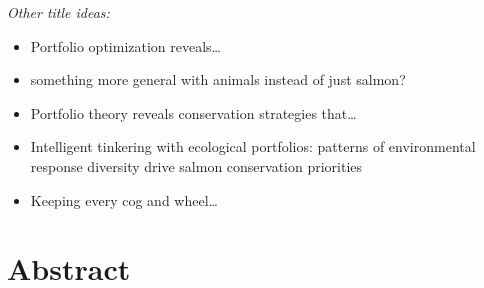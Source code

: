 \emph{Other title ideas:}

\begin{itemize}
\item
  Portfolio optimization reveals\ldots{}
\item
  something more general with animals instead of just salmon?
\item
  Portfolio theory reveals conservation strategies that\ldots{}
\item
  Intelligent tinkering with ecological portfolios: patterns of
  environmental response diversity drive salmon conservation priorities
\item
  Keeping every cog and wheel\ldots{}
\end{itemize}

\section{Abstract}

